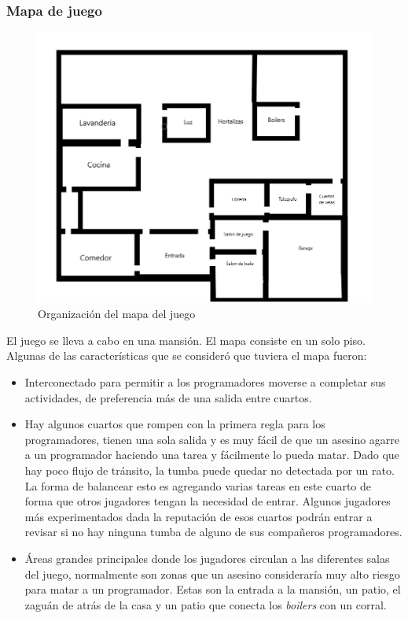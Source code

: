 \subsubsection{Mapa de juego}
\begin{figure}[h]
    \centering
    \includegraphics[width=1\linewidth]{images/MapaJuego.png}
    \caption{Organización del mapa del juego}
    \label{fig:mapa_juego}
\end{figure}
El juego se lleva a cabo en una mansión. El mapa consiste en un solo piso. Algunas de las características que se consideró que tuviera el mapa fueron:
\begin{itemize}
    \item Interconectado para permitir a los programadores moverse a completar sus actividades, de preferencia más de una salida entre cuartos. 
    \item Hay algunos cuartos que rompen con la primera regla para los programadores, tienen una sola salida y es muy fácil de que un asesino agarre a un programador haciendo una tarea y fácilmente lo pueda matar. Dado que hay poco flujo de tránsito, la tumba puede quedar no detectada por un rato. La forma de balancear esto es agregando varias tareas en este cuarto de forma que otros jugadores tengan la necesidad de entrar. Algunos jugadores más experimentados dada la reputación de esos cuartos podrán entrar a revisar si no hay ninguna tumba de alguno de sus compañeros programadores.
    \item Áreas grandes principales donde los jugadores circulan a las diferentes salas del juego, normalmente son zonas que un asesino consideraría muy alto riesgo para matar a un programador. Estas son la entrada a la mansión, un patio, el zaguán de atrás de la casa y un patio que conecta los \textit{boilers} con un corral.
\end{itemize}


